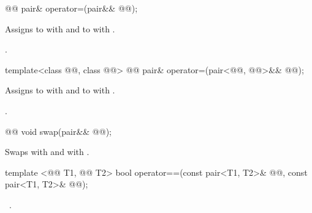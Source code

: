 \documentclass[american,twoside]{book}
\begin{document}
\begin{itemdecl}
@@ pair& operator=(pair&& @@);
\end{itemdecl}

\begin{itemdescr}
\pnum
\mbox{\effects}
Assigns to \mbox{} with \mbox{}
and to \mbox{} with \mbox{}.

\pnum
\mbox{\returns} \mbox{}.
\end{itemdescr}

\begin{itemdecl}
template<class @@, class @@> 
  @@
  pair& operator=(pair<@@, @@>&& @@);
\end{itemdecl}

\begin{itemdescr}
\pnum
\mbox{\effects}
Assigns to \mbox{} with \mbox{}
and to \mbox{} with \mbox{}.

\pnum
\mbox{\returns} \mbox{}.
\end{itemdescr}

\begin{itemdecl}
@@ void swap(pair&& @@);
\end{itemdecl}

\begin{itemdescr}
\pnum
\mbox{\effects} Swaps
\mbox{} with \mbox{} and
\mbox{} with \mbox{}.

\pnum
{}
\end{itemdescr}

%
\begin{itemdecl}
template <@@ T1, @@ T2>
  bool operator==(const pair<T1, T2>& @@, const pair<T1, T2>& @@);
\end{itemdecl}

\begin{itemdescr}
\pnum
\returns\ 
.
\end{itemdescr}
\end{document}
